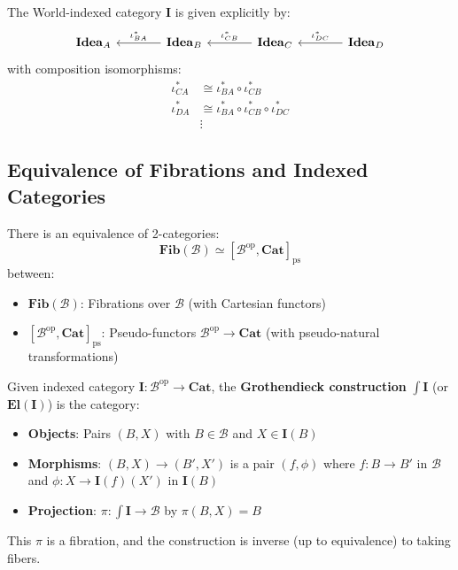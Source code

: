 \begin{proposition}
\label{prop:explicit-indexed}
The World-indexed category $\mathbf{I}$ is given explicitly by:
\[
\begin{tikzcd}[column sep=large]
  \mathbf{Idea}_A & \mathbf{Idea}_B \arrow[l, "\iota_{BA}^*"'] &
  \mathbf{Idea}_C \arrow[l, "\iota_{CB}^*"'] & \mathbf{Idea}_D \arrow[l, "\iota_{DC}^*"']
\end{tikzcd}
\]
with composition isomorphisms:
\begin{align*}
  \iota_{CA}^* &\cong \iota_{BA}^* \circ \iota_{CB}^* \\
  \iota_{DA}^* &\cong \iota_{BA}^* \circ \iota_{CB}^* \circ \iota_{DC}^* \\
  &\vdots
\end{align*}
\end{proposition}

\subsection{Equivalence of Fibrations and Indexed Categories}
\label{subsec:equiv-fib-indexed}

\begin{theorem}
\label{thm:grothendieck-construction}
There is an equivalence of 2-categories:
\[
  \mathbf{Fib}(\mathcal{B}) \simeq [\mathcal{B}^{\mathrm{op}}, \mathbf{Cat}]_{\mathrm{ps}}
\]
between:
\begin{itemize}
  \item $\mathbf{Fib}(\mathcal{B})$: Fibrations over $\mathcal{B}$ (with Cartesian functors)
  \item $[\mathcal{B}^{\mathrm{op}}, \mathbf{Cat}]_{\mathrm{ps}}$: Pseudo-functors
        $\mathcal{B}^{\mathrm{op}} \to \mathbf{Cat}$ (with pseudo-natural transformations)
\end{itemize}
\end{theorem}

\begin{construction}
\label{constr:fib-from-indexed}
Given indexed category $\mathbf{I} : \mathcal{B}^{\mathrm{op}} \to \mathbf{Cat}$,
the \textbf{Grothendieck construction} $\int \mathbf{I}$ (or $\mathbf{El}(\mathbf{I})$)
is the category:
\begin{itemize}
  \item \textbf{Objects}: Pairs $(B, X)$ with $B \in \mathcal{B}$ and $X \in \mathbf{I}(B)$
  \item \textbf{Morphisms}: $(B, X) \to (B', X')$ is a pair $(f, \phi)$ where
        $f : B \to B'$ in $\mathcal{B}$ and $\phi : X \to \mathbf{I}(f)(X')$ in $\mathbf{I}(B)$
  \item \textbf{Projection}: $\pi : \int \mathbf{I} \to \mathcal{B}$ by $\pi(B, X) = B$
\end{itemize}
This $\pi$ is a fibration, and the construction is inverse (up to equivalence)
to taking fibers.
\end{construction}

